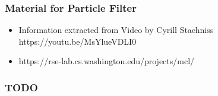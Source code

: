     
\begin{frame}
    \frametitle{Material for Particle Filter}

    \begin{itemize}
        \item Information extracted from Video by Cyrill Stachniss https://youtu.be/MsYlueVDLI0
        \item https://rse-lab.cs.washington.edu/projects/mcl/
    \end{itemize}

\end{frame}


\begin{frame}
    \frametitle{TODO}


\end{frame}